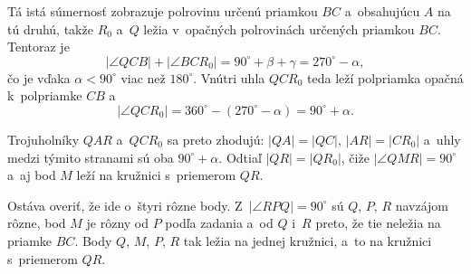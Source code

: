 {    Tá istá súmernosť zobrazuje polrovinu určenú priamkou $BC$ a~obsahujúcu $A$ na tú druhú, takže $R_0$ a~$Q$ ležia v~opačných polrovinách určených priamkou $BC$. Tentoraz je
    $$
    |\angle QCB| + |\angle BCR_0| = 90^\circ + \beta + \gamma = 270^\circ - \alpha,
    $$
    čo je vďaka $\alpha < 90^\circ$ viac než $180^\circ$. Vnútri uhla $QCR_0$ teda leží polpriamka opačná k~polpriamke $CB$ a~
    $$
    |\angle QCR_0| = 360^\circ - (270^\circ - \alpha) = 90^\circ + \alpha.
    $$

    Trojuholníky $QAR$ a~$QCR_0$ sa preto zhodujú: $|QA| = |QC|$, $|AR| = |CR_0|$ a~uhly medzi týmito stranami sú oba $90^\circ + \alpha$. Odtiaľ $|QR| = |QR_0|$, čiže $|\angle QMR| = 90^\circ$ a~aj bod $M$ leží na kružnici s~priemerom $QR$.

    Ostáva overiť, že ide o~štyri rôzne body. Z~$|\angle RPQ| = 90^\circ$ sú $Q$, $P$, $R$ navzájom rôzne, bod $M$ je rôzny od $P$ podľa zadania a~od $Q$ i~$R$ preto, že tie neležia na priamke $BC$. Body $Q$, $M$, $P$, $R$ tak ležia na jednej kružnici, a~to na kružnici s~priemerom $QR$.
}

